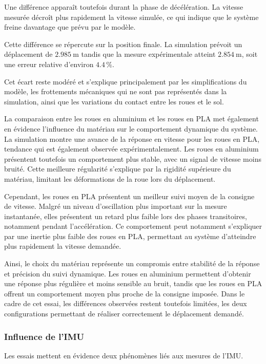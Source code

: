 Une différence apparaît toutefois durant la phase de décélération. La vitesse mesurée décroît plus rapidement la vitesse simulée, ce qui indique que le système freine davantage que prévu par le modèle.

Cette différence se répercute sur la position finale. La simulation prévoit un déplacement de $2.985~\si{\meter}$ tandis que la mesure expérimentale atteint $2.854~\si{\meter}$, soit une erreur relative d'environ $4.4\,\%$.

Cet écart reste modéré et s'explique principalement par les simplifications du modèle, les frottements mécaniques qui ne sont pas représentés dans la simulation, ainsi que les variations du contact entre les roues et le sol.

La comparaison entre les roues en aluminium et les roues en PLA met également en évidence l'influence du matériau sur le comportement dynamique du système. La simulation montre une avance de la réponse en vitesse pour les roues en PLA, tendance qui est également observée expérimentalement. Les roues en aluminium présentent toutefois un comportement plus stable, avec un signal de vitesse moins bruité. Cette meilleure régularité s'explique par la rigidité supérieure du matériau, limitant les déformations de la roue lors du déplacement.

Cependant, les roues en PLA présentent un meilleur suivi moyen de la consigne de vitesse. Malgré un niveau d'oscillation plus important sur la mesure instantanée, elles présentent un retard plus faible lors des phases transitoires, notamment pendant l'accélération. Ce comportement peut notamment s'expliquer par une inertie plus faible des roues en PLA, permettant au système d'atteindre plus rapidement la vitesse demandée.

Ainsi, le choix du matériau représente un compromis entre stabilité de la réponse et précision du suivi dynamique. Les roues en aluminium permettent d'obtenir une réponse plus régulière et moins sensible au bruit, tandis que les roues en PLA offrent un comportement moyen plus proche de la consigne imposée. Dans le cadre de cet essai, les différences observées restent toutefois limitées, les deux configurations permettant de réaliser correctement le déplacement demandé.
\subsubsection{Influence de l'IMU}

Les essais mettent en évidence deux phénomènes liés aux mesures de l'IMU.

